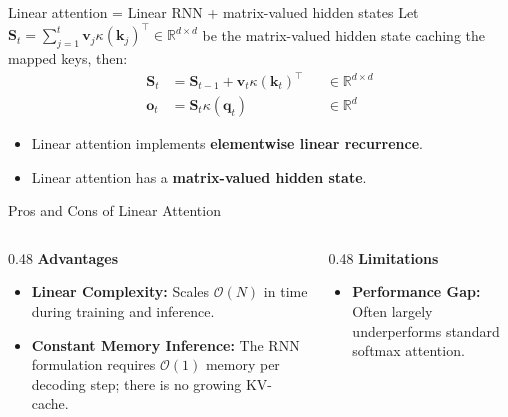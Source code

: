 \documentclass{beamer}
\begin{document}
\begin{frame}{Linear attention = Linear RNN + matrix-valued hidden states}
	Let $\mathbf{S}_t = \sum_{j=1}^t \mathbf{v}_j \kappa(\mathbf{k}_j)^\top \in \mathbb{R}^{d \times d}$ be the matrix-valued hidden state caching the mapped keys, then:
	\[
		\begin{aligned}
			\mathbf{S}_t & = \mathbf{S}_{t-1} + \mathbf{v}_t\kappa(\mathbf{k}_t)^\top &  & \in \mathbb{R}^{d \times d} \\
			\mathbf{o}_t & = \mathbf{S}_t\kappa(\mathbf{q}_t)                         &  & \in \mathbb{R}^d
		\end{aligned}
	\]

	\begin{itemize}
		\item Linear attention implements {\color{red}\textbf{elementwise linear recurrence}}.
		\item Linear attention has a {\color{red}\textbf{matrix-valued hidden state}}.
	\end{itemize}
\end{frame}

\begin{frame}{Pros and Cons of Linear Attention}
	\begin{columns}[T] %

		\begin{column}{0.48\textwidth}
			\textbf{\textcolor{green!60!black}{Advantages}}
			\begin{itemize}
				\item \textbf{Linear Complexity:} Scales $\mathcal{O}(N)$ in time during training and inference.
				\item \textbf{Constant Memory Inference:} The RNN formulation requires $\mathcal{O}(1)$ memory per decoding step; there is no growing KV-cache.
			\end{itemize}
		\end{column}
		\begin{column}{0.48\textwidth}
			\textbf{\textcolor{red!60!black}{Limitations}}
			\begin{itemize}
				\item \textbf{Performance Gap:} Often largely underperforms standard softmax attention.
			\end{itemize}
		\end{column}

	\end{columns}
\end{frame}
\end{document}
